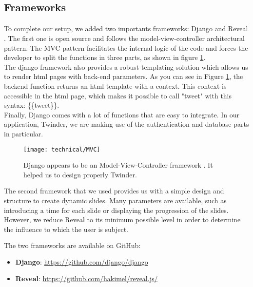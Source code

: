 \subsection{Frameworks}

\paragraph{}
To complete our setup, we added two importants frameworks: Django \cite{django} and Reveal \cite{reveal}. The first one is open source and follows the model-view-controller architectural pattern. The MVC pattern facilitates the internal logic of the code and forces the developer to split the functions in three parts, as shown in figure \ref{fig:MVC_design}. \\
The django framework also provides a robust templating solution which allows us to render html pages with back-end parameters. As you can see in Figure \ref{fig:MVC_design}, the backend function returns an html template with a context. This context is accessible in the html page, which makes it possible to call "tweet" with this syntax: \{\{tweet\}\}.\\
Finally, Django comes with a lot of functions that are easy to integrate. In our application, Twinder, we are making use of the authentication and database parts in particular.



\begin{figure}[h] 
\centering 
\texttt{[image: technical/MVC]} 
\caption[MVC model]{Django appears to be an Model-View-Controller framework \cite{mvc_django}. It helped us to design properly Twinder.}
\label{fig:MVC_design} 
\end{figure}

The second framework that we used provides us with a simple design and structure to create dynamic slides. Many parameters are available, such as introducing a time for each slide or displaying the progression of the slides. However, we reduce Reveal to its minimum possible level in order to determine the influence to which the user is subject.

The two frameworks are available on GitHub: 
\begin{itemize}
  \item \textbf{Django}: \url{https://github.com/django/django}
  \item \textbf{Reveal}: \url{https://github.com/hakimel/reveal.js/}
\end{itemize}

